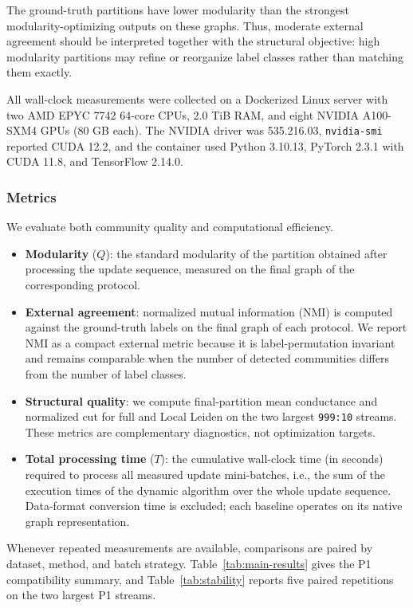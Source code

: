 \documentclass[conference]{IEEEtran}
\theoremstyle{definition}
\begin{document}
The ground-truth partitions have lower modularity than the strongest
modularity-optimizing outputs on these graphs. Thus, moderate external
agreement should be interpreted together with the structural objective: high
modularity partitions may refine or reorganize label classes rather than
matching them exactly.

All wall-clock measurements were collected on a Dockerized Linux server with
two AMD EPYC 7742 64-core CPUs, 2.0 TiB RAM, and eight NVIDIA A100-SXM4 GPUs
(80 GB each). The NVIDIA driver was 535.216.03, \texttt{nvidia-smi} reported
CUDA 12.2, and the container used Python 3.10.13, PyTorch 2.3.1 with CUDA 11.8,
and TensorFlow 2.14.0.

\subsubsection{Metrics}
We evaluate both community quality and computational efficiency.
\begin{itemize}
    \item \textbf{Modularity} ($Q$): the standard modularity of the partition obtained after processing the update sequence, measured on the final graph of the corresponding protocol.
    \item \textbf{External agreement}: normalized mutual information (NMI) is computed against the ground-truth labels on the final graph of each protocol. We report NMI as a compact external metric because it is label-permutation invariant and remains comparable when the number of detected communities differs from the number of label classes.
    \item \textbf{Structural quality}: we compute final-partition mean conductance and normalized cut for full and Local Leiden on the two largest \texttt{999:10} streams. These metrics are complementary diagnostics, not optimization targets.
    \item \textbf{Total processing time} ($T$): the cumulative wall-clock time (in seconds) required to process all measured update mini-batches, i.e., the sum of the execution times of the dynamic algorithm over the whole update sequence. Data-format conversion time is excluded; each baseline operates on its native graph representation.
\end{itemize}
Whenever repeated measurements are available, comparisons are paired by dataset,
method, and batch strategy. Table~\ref{tab:main-results} gives the P1
compatibility summary, and Table~\ref{tab:stability} reports five paired
repetitions on the two largest P1 streams.
\end{document}
